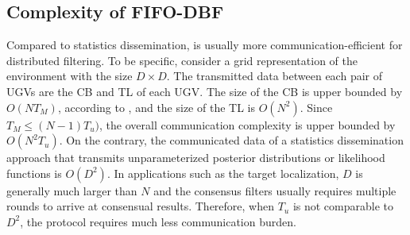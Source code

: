 	
	\subsection{Complexity of FIFO-DBF}
	Compared to statistics dissemination, {\proto} is usually more communication-efficient for distributed filtering. 
	To be specific, consider a grid representation of the environment with the size $D\times D$. %
	The transmitted data between each pair of UGVs are the CB and TL of each UGV.
	The size of the CB is upper bounded by $O(NT_M)$, according to , and the size of the TL is $O(N^2)$.
	Since $T_M\le (N-1)T_u)$, the overall communication complexity is upper bounded by $O(N^2T_u)$.	
	On the contrary, the communicated data of a statistics dissemination approach that transmits unparameterized posterior distributions or likelihood functions is $O(D^2)$.
	In applications such as the target localization, $D$ is generally much larger than $N$ and the consensus filters usually requires multiple rounds to arrive at consensual results.
	Therefore, when $T_u$ is not comparable to $D^2$, the {\proto} protocol requires much less communication burden.
	
